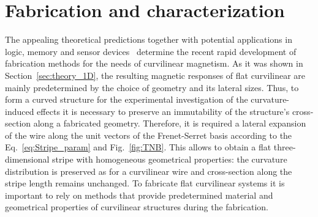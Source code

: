 \section{Fabrication and characterization}\label{sec:fabrication}

The appealing theoretical predictions together with potential applications in logic, memory and sensor devices~\cite{Allwood02,Allwood05,Parkin08,Parkin15} determine the recent rapid development of fabrication methods for the needs of curvilinear magnetism. As it was shown in Section~\ref{sec:theory_1D}, the resulting magnetic responses of flat curvilinear are mainly predetermined by the choice of geometry and its lateral sizes. Thus, to form a curved structure for the experimental investigation of the curvature-induced effects it is necessary to preserve an immutability of the structure's cross-section along a fabricated geometry. Therefore, it is required a lateral expansion of the wire along the unit vectors of the Frenet-Serret basis according to the Eq.~\eqref{eq:Stripe_param} and Fig.~\ref{fig:TNB}. This allows to obtain a flat three-dimensional stripe with homogeneous geometrical properties: the curvature distribution is preserved as for a curvilinear wire and cross-section along the stripe length remains unchanged. To fabricate flat curvilinear systems it is important to rely on methods that provide predetermined material and geometrical properties of curvilinear structures during the fabrication. 

